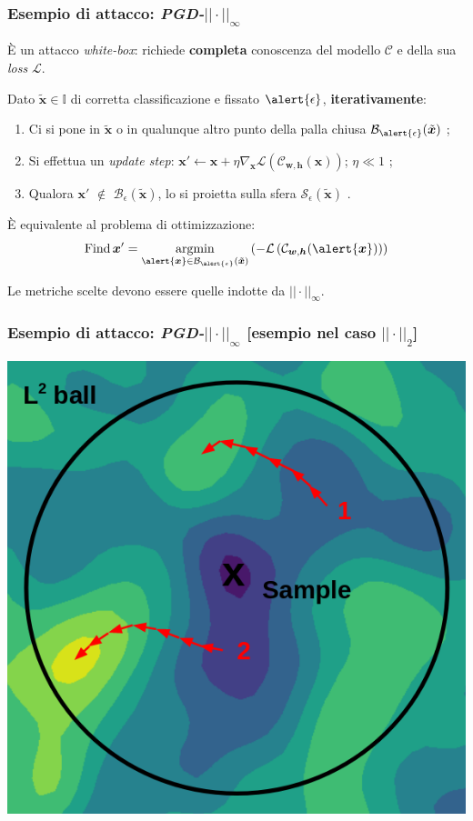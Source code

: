 \documentclass{beamer}
\DeclareMathOperator*{\argmin}{argmin}
\DeclareMathOperator*{\Find}{Find}
\begin{document}
{\begin{frame}
\end{frame}


\begin{frame}
	\frametitle{Esempio di attacco: \textit{PGD-${||\cdot||}_{\infty}$}}

	È un attacco \textit{white-box}: richiede \textbf{completa} conoscenza del modello $\mathcal{C}$ e della sua \textit{loss} $\mathcal{L}$.
	\hfill\break

	Dato $\tilde{\boldsymbol{x}} \in \mathbb{I}$ di corretta classificazione e fissato $\alert{\epsilon}$, \textbf{iterativamente}:
	\begin{enumerate}
		\item {Ci si pone in $\tilde{\boldsymbol{x}}$ o in qualunque altro punto della palla chiusa $\mathcal{B}_{\alert{\epsilon}}{(\tilde{\boldsymbol{x}})}$ };
		\item { Si effettua un \textit{update step}: $\boldsymbol{x'} \leftarrow \boldsymbol{x} + {\eta} \nabla_{\boldsymbol{x}}\mathcal{L}\left(\mathcal{C}_{\boldsymbol{w}, \boldsymbol{h}}{\left({\boldsymbol{x}}\right)}\right)$; $\eta \ll 1$ };
		\item{ Qualora $\boldsymbol{x'}$ $\notin$  $\mathcal{B}_{{\epsilon}}{(\tilde{\boldsymbol{x}})}$, lo si proietta sulla sfera $\mathcal{S}_{{\epsilon}}{(\tilde{\boldsymbol{x}})}$ }.
	\end{enumerate}




	\begin{block}{È equivalente al problema di ottimizzazione:}
		$$\Find \boldsymbol{x}' = \argmin_{\alert{\boldsymbol{x}} \in \mathcal{B}_{\alert{\epsilon}}{(\tilde{\boldsymbol{x}})}}\left(-\mathcal{L}\left(\mathcal{C}_{\boldsymbol{w}, \boldsymbol{h}}{\left(\alert{\boldsymbol{x}}\right)}\right)\right)$$
	\end{block}
\hfill\break
Le metriche scelte devono essere quelle indotte da ${||\cdot||}_{\infty}$.
\end{frame}


\begin{frame}
	\frametitle{Esempio di attacco: \textit{PGD-${||\cdot||}_{\infty}$} [esempio nel caso ${||\cdot||}_{2}$]}
	\center \includegraphics[height=0.60\linewidth]{pgdball.png}
\end{frame}

}
\end{document}

